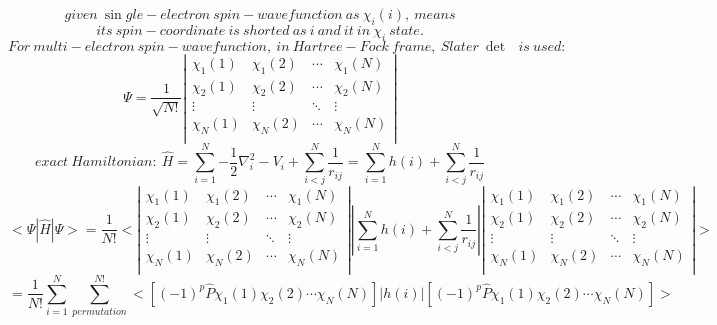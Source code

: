 $$
given\ \sin gle-electron\ spin-wavefunction\ as\ \chi _i\left( i \right) ,\ means
$$
$$
its\ spin-coordinate\ is\ shorted\ as\ i\ and\ it\ in\ \chi _i\ state.
$$
$$
For\ multi-electron\ spin-wavefunction,\ in\ Hartree-Fock\ frame,\ Slater\ \det\text{\ }is\ used:
$$
$$
\varPsi =\frac{1}{\sqrt{N!}}\left| \begin{matrix}
	\chi _1\left( 1 \right)&		\chi _1\left( 2 \right)&		\cdots&		\chi _1\left( N \right)\\
	\chi _2\left( 1 \right)&		\chi _2\left( 2 \right)&		\cdots&		\chi _2\left( N \right)\\
	\vdots&		\vdots&		\ddots&		\vdots\\
	\chi _N\left( 1 \right)&		\chi _N\left( 2 \right)&		\cdots&		\chi _N\left( N \right)\\
\end{matrix} \right|
$$
$$
exact\ Hamiltonian:\ \hat{H}=\sum_{i=1}^N{-\frac{1}{2}\nabla _{i}^{2}-V_i}+\sum_{i<j}^N{\frac{1}{r_{ij}}}=\sum_{i=1}^N{h\left( i \right)}+\sum_{i<j}^N{\frac{1}{r_{ij}}}
$$
$$
<\varPsi |\hat{H}|\varPsi >=\frac{1}{N!}<\left| \begin{matrix}
	\chi _1\left( 1 \right)&		\chi _1\left( 2 \right)&		\cdots&		\chi _1\left( N \right)\\
	\chi _2\left( 1 \right)&		\chi _2\left( 2 \right)&		\cdots&		\chi _2\left( N \right)\\
	\vdots&		\vdots&		\ddots&		\vdots\\
	\chi _N\left( 1 \right)&		\chi _N\left( 2 \right)&		\cdots&		\chi _N\left( N \right)\\
\end{matrix} \right||\sum_{i=1}^N{h\left( i \right)}+\sum_{i<j}^N{\frac{1}{r_{ij}}}|\left| \begin{matrix}
	\chi _1\left( 1 \right)&		\chi _1\left( 2 \right)&		\cdots&		\chi _1\left( N \right)\\
	\chi _2\left( 1 \right)&		\chi _2\left( 2 \right)&		\cdots&		\chi _2\left( N \right)\\
	\vdots&		\vdots&		\ddots&		\vdots\\
	\chi _N\left( 1 \right)&		\chi _N\left( 2 \right)&		\cdots&		\chi _N\left( N \right)\\
\end{matrix} \right|>
$$
$$
=\frac{1}{N!}\sum_{i=1}^N{\sum_{permutation}^{N!}{<\left[ \left( -1 \right) ^p\hat{P}\chi _1\left( 1 \right) \chi _2\left( 2 \right) \cdots \chi _N\left( N \right) \right] |h\left( i \right) |\left[ \left( -1 \right) ^p\hat{P}\chi _1\left( 1 \right) \chi _2\left( 2 \right) \cdots \chi _N\left( N \right) \right] >}}
$$
